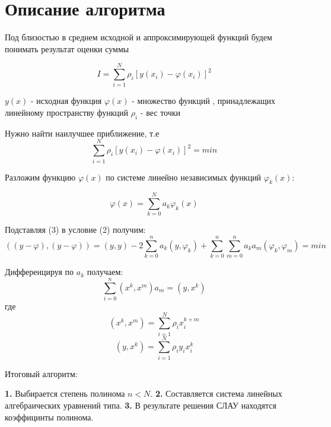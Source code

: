 \documentclass[a4paper,12pt]{article}
\begin{document}
\section{Описание алгоритма}
\begin{flushleft}
Под близостью в среднем исходной и аппроксимирующей  функций будем понимать результат оценки суммы 

\begin{equation}
	I = \sum_{i=1}^{N} \rho_{i}[y(x_{i}) - \varphi(x_{i})]^2
	\label{eq:ref}
\end{equation}

$y(x)$ - исходная функция\newline
$\varphi(x)$ - множество функций , принадлежащих линейному пространству функций\newline
$\rho_{i}$ - вес точки\newline

Нужно найти наилучшее приближение, т.е
\begin{equation}
	\sum_{i=1}^{N} \rho_{i}[y(x_{i}) - \varphi(x_{i})]^2 = min
	\label{eq:ref}
\end{equation}

Разложим функцию $\varphi(x)$ по системе линейно независимых функций $\varphi_{k}(x)$:

\begin{equation}
	\varphi(x) = \sum_{k=0}^{N}a_{k}\varphi_{k}(x)
	\label{eq:ref}
\end{equation}

Подставляя (3) в условие (2) получим:
\begin{equation}
	((y - \varphi), (y - \varphi)) = (y, y) - 2\sum_{k=0}^{n}a_{k}(y,\varphi_{k}) + \sum_{k=0}^{n}\sum_{m=0}^{n}a_{k}a_{m}(\varphi_{k},\varphi_{m}) = min
	\label{eq:ref}
\end{equation}

Дифференцируя по $a_{k}$ получаем:
\begin{equation}
	\sum_{i=0}^{n}(x^k, x^m)a_{m} = (y, x^k)
	\label{eq:ref}
\end{equation}
где
$$(x^k, x^m) = \sum_{i=1}^{N}\rho_{i}x_{i}^{k+m}$$
$$(y, x^k) = \sum_{i=1}^{N}\rho_{i}y_{i}x_{i}^{k}$$\newline

Итоговый алгоритм: 

\noindent\textbf{1.} Выбирается степень полинома $n < N$. \newline
\noindent\textbf{2.} Составляется система линейных алгебраических уравнений типа.\newline
\noindent\textbf{3.} В результате решения СЛАУ находятся коэффицинты полинома.
\end{flushleft}
\end{document}
